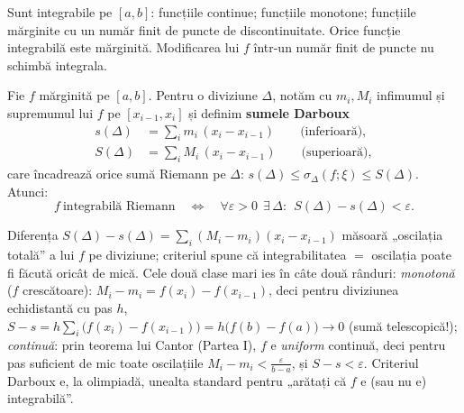 \begin{teorema}
Sunt integrabile pe $[a,b]$: funcțiile continue; funcțiile monotone; funcțiile mărginite cu un număr finit de puncte de discontinuitate. Orice funcție integrabilă este mărginită. Modificarea lui $f$ într-un număr finit de puncte nu schimbă integrala.
\end{teorema}

\begin{teorema}
Fie $f$ mărginită pe $[a,b]$. Pentru o diviziune $\Delta$, notăm cu $m_i,M_i$ infimumul și supremumul lui $f$ pe $[x_{i-1},x_i]$ și definim \textbf{sumele Darboux}
\[
\begin{aligned}
s(\Delta)&=\sum_i m_i\,(x_i-x_{i-1})\qquad\text{(inferioară)},\\
S(\Delta)&=\sum_i M_i\,(x_i-x_{i-1})\qquad\text{(superioară)},
\end{aligned}
\]
care încadrează orice sumă Riemann pe $\Delta$: $s(\Delta)\le\sigma_\Delta(f;\xi)\le S(\Delta)$. Atunci:
\[
f\ \text{integrabilă Riemann}\quad\Longleftrightarrow\quad
\forall\varepsilon>0\ \ \exists\,\Delta:\ \ S(\Delta)-s(\Delta)<\varepsilon.
\]
\end{teorema}

\begin{obs}
Diferența $S(\Delta)-s(\Delta)=\sum_i(M_i-m_i)(x_i-x_{i-1})$ măsoară „oscilația totală'' a lui $f$ pe diviziune; criteriul spune că integrabilitatea $=$ oscilația poate fi făcută oricât de mică. Cele două clase mari ies în câte două rânduri:
\emph{monotonă} ($f$ crescătoare): $M_i-m_i=f(x_i)-f(x_{i-1})$, deci pentru diviziunea echidistantă cu pas $h$,
$S-s=h\sum_i\big(f(x_i)-f(x_{i-1})\big)=h\big(f(b)-f(a)\big)\to0$ (sumă telescopică!);
\emph{continuă}: prin teorema lui Cantor (Partea I), $f$ e \emph{uniform} continuă, deci pentru pas suficient de mic toate oscilațiile $M_i-m_i<\frac{\varepsilon}{b-a}$, și $S-s<\varepsilon$. Criteriul Darboux e, la olimpiadă, unealta standard pentru „arătați că $f$ e (sau nu e) integrabilă''.
\end{obs}

